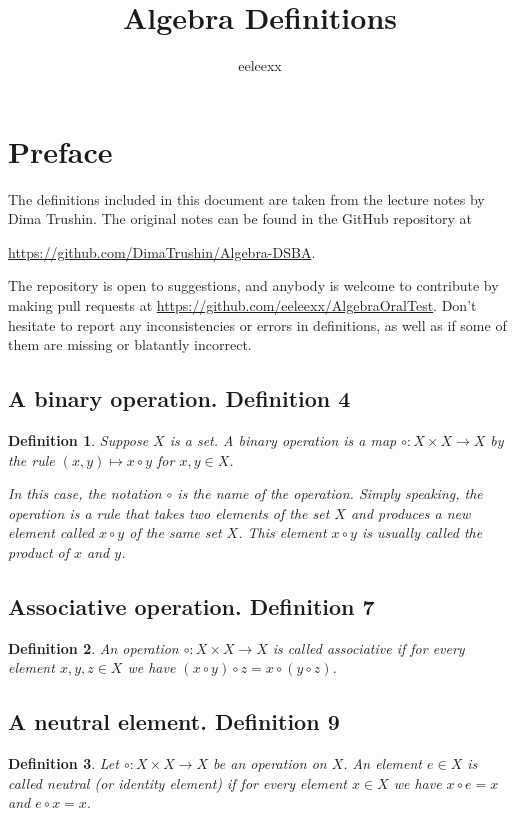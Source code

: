 \documentclass{article}
\title{Algebra Definitions}
\author{eeleexx}
\newtheorem*{customdefinition}{Definition}
\begin{document}
\maketitle

\section*{Preface}
The definitions included in this document are taken from the lecture notes by Dima Trushin. The original notes can be found in the GitHub repository at

\url{https://github.com/DimaTrushin/Algebra-DSBA}.

The repository is open to suggestions, and anybody is welcome to contribute by making pull requests at \url{https://github.com/eeleexx/AlgebraOralTest}. Don't hesitate to report any inconsistencies or errors in definitions, as well as if some of them are missing or blatantly incorrect.

\subsection*{A binary operation. Definition 4}
\begin{customdefinition}
Suppose \(X\) is a set. A binary operation is a map \(\circ : X \times X \rightarrow X\) by the rule \((x, y) \mapsto x \circ y\) for \(x, y \in X\).

In this case, the notation \(\circ\) is the name of the operation. Simply speaking, the operation is a rule that takes two elements of the set \(X\) and produces a new element called \(x \circ y\) of the same set \(X\). This element \(x \circ y\) is usually called the product of \(x\) and \(y\).
\end{customdefinition}

\subsection*{Associative operation. Definition 7}
\begin{customdefinition}
An operation \(\circ : X \times X \rightarrow X\) is called associative if for every element \(x, y, z \in X\) we have \((x \circ y) \circ z = x \circ (y \circ z)\).
\end{customdefinition}

\subsection*{A neutral element. Definition 9}
\begin{customdefinition}
Let \(\circ : X \times X \rightarrow X\) be an operation on \(X\). An element \(e \in X\) is called neutral (or identity element) if for every element \(x \in X\) we have \(x \circ e = x\) and \(e \circ x = x\).
\end{customdefinition}
\end{document}
